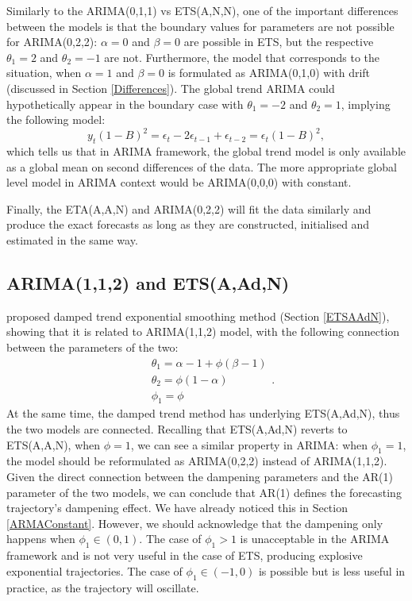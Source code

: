 \documentclass[]{book}
\theoremstyle{definition}
\theoremstyle{definition}
\theoremstyle{definition}
\theoremstyle{definition}
\theoremstyle{remark}
\begin{document}
Similarly to the ARIMA(0,1,1) vs ETS(A,N,N), one of the important differences between the models is that the boundary values for parameters are not possible for ARIMA(0,2,2): \(\alpha=0\) and \(\beta=0\) are possible in ETS, but the respective \(\theta_1=2\) and \(\theta_2=-1\) are not. Furthermore, the model that corresponds to the situation, when \(\alpha=1\) and \(\beta=0\) is formulated as ARIMA(0,1,0) with drift (discussed in Section \ref{Differences}). The global trend ARIMA could hypothetically appear in the boundary case with \(\theta_1=-2\) and \(\theta_2=1\), implying the following model:
\begin{equation*}
    y_t (1 -B)^2 = \epsilon_t -2\epsilon_{t-1} + \epsilon_{t-2} = \epsilon_t (1 -B)^2 ,
\end{equation*}
which tells us that in ARIMA framework, the global trend model is only available as a global mean on second differences of the data. The more appropriate global level model in ARIMA context would be ARIMA(0,0,0) with constant.

Finally, the ETA(A,A,N) and ARIMA(0,2,2) will fit the data similarly and produce the exact forecasts as long as they are constructed, initialised and estimated in the same way.

\hypertarget{ARIMAETS112}{%
\subsection{ARIMA(1,1,2) and ETS(A,Ad,N)}\label{ARIMAETS112}}

\citet{Roberts1982} proposed damped trend exponential smoothing method (Section \ref{ETSAAdN}), showing that it is related to ARIMA(1,1,2) model, with the following connection between the parameters of the two:
\begin{equation*}
  \begin{aligned}
    &\theta_1 = \alpha -1 + \phi (\beta -1) \\
    &\theta_2 = \phi(1 -\alpha) \\
    &\phi_1 = \phi
  \end{aligned} .
\end{equation*}
At the same time, the damped trend method has underlying ETS(A,Ad,N), thus the two models are connected. Recalling that ETS(A,Ad,N) reverts to ETS(A,A,N), when \(\phi=1\), we can see a similar property in ARIMA: when \(\phi_1=1\), the model should be reformulated as ARIMA(0,2,2) instead of ARIMA(1,1,2). Given the direct connection between the dampening parameters and the AR(1) parameter of the two models, we can conclude that AR(1) defines the forecasting trajectory's dampening effect. We have already noticed this in Section \ref{ARMAConstant}. However, we should acknowledge that the dampening only happens when \(\phi_1 \in (0,1)\). The case of \(\phi_1>1\) is unacceptable in the ARIMA framework and is not very useful in the case of ETS, producing explosive exponential trajectories. The case of \(\phi_1 \in (-1, 0)\) is possible but is less useful in practice, as the trajectory will oscillate.
\end{document}

